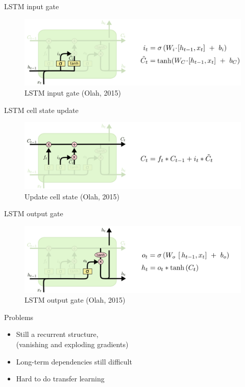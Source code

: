 \begin{frame}{LSTM input gate}

\begin{figure}[h]
\centering
\includegraphics[width=1\textwidth]{fig/Olah_LSTM3_update.png}
\caption{LSTM input gate (Olah, 2015)}
\end{figure}

\end{frame}

\begin{frame}{LSTM cell state update}

\begin{figure}[h]
\centering
\includegraphics[width=1\textwidth]{fig/Olah_LSTM3_update2.png}
\caption{Update cell state (Olah, 2015)}
\end{figure}

\end{frame}

\begin{frame}{LSTM output gate}

\begin{figure}[h]
\centering
\includegraphics[width=1\textwidth]{fig/Olah_LSTM3_output.png}
\caption{LSTM output gate (Olah, 2015)}
\end{figure}

\end{frame}


\begin{frame}{Problems}

\begin{itemize}
\item Still a {\color{uured} recurrent structure},\\(vanishing and exploding gradients)
\item Long-term dependencies still difficult
\item Hard to do {\color{uured} transfer learning}
\end{itemize}


\end{frame}

